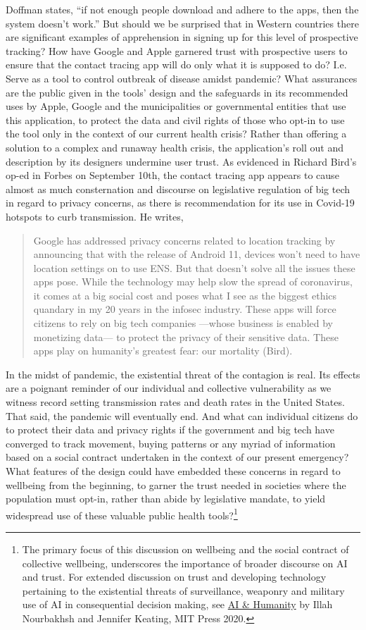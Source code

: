 \documentclass[11pt,dvipdfm]{article}
\begin{document}
Doffman states, ``if not enough people download and adhere to the apps, then the system doesn’t work.''  But should we be surprised that in Western countries there are significant examples of apprehension in signing up for this level of prospective tracking?  How have Google and Apple garnered trust with prospective users to ensure that the contact tracing app will do only what it is supposed to do? I.e. Serve as a tool to control outbreak of disease amidst pandemic?  What assurances are the public given in the tools’ design and the safeguards in its recommended uses by Apple, Google and the municipalities or governmental entities that use this application, to protect the data and civil rights of those who opt-in to use the tool only in the context of our current health crisis?    Rather than offering a solution to a complex and runaway health crisis, the application’s roll out and description by its designers undermine user trust.  As evidenced in Richard Bird’s op-ed in Forbes on September 10th, the contact tracing app appears to cause almost as much consternation and discourse on legislative regulation of big tech in regard to privacy concerns, as there is recommendation for its use in Covid-19 hotspots to curb transmission.  He writes,
\begin{quote}
	Google has addressed privacy concerns related to location tracking by announcing that with the release of Android 11, devices won’t need to have location settings on to use ENS.  But that doesn’t solve all the issues these apps pose.  While the technology may help slow the spread of coronavirus, it comes at a big social cost and poses what I see as the biggest ethics quandary in my 20 years in the infosec industry.  These apps will force citizens to rely on big tech companies ---whose business is enabled by monetizing data--- to protect the privacy of their sensitive data.  These apps play on humanity’s greatest fear:  our mortality (Bird).
\end{quote}
In the midst of pandemic, the existential threat of the contagion is real.  Its effects are a poignant reminder of our individual and collective vulnerability as we witness record setting transmission rates and death rates in the United States.  That said, the pandemic will eventually end.  And what can individual citizens do to protect their data and privacy rights if the government and big tech have converged to track movement, buying patterns or any myriad of information based on a social contract undertaken in the context of our present emergency?  What features of the design could have embedded these concerns in regard to wellbeing from the beginning, to garner the trust needed in societies where the population must opt-in, rather than abide by legislative mandate, to yield widespread use of these valuable public health tools?\footnote{The primary focus of this discussion on wellbeing and the social contract of collective wellbeing, underscores the importance of broader discourse on AI and trust.  For extended discussion on trust and developing technology pertaining to the existential threats of surveillance, weaponry and military use of AI in consequential decision making, see \underline{AI \& Humanity} by Illah Nourbakhsh and Jennifer Keating, MIT Press 2020.}
\end{document}
